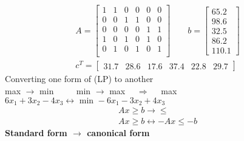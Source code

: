 \begin{gather*}
	A = \begin{bmatrix}
		1 & 1 & 0 & 0 & 0 & 0\\
		0 & 0 & 1 & 1 & 0 & 0\\
		0 & 0 & 0 & 0 & 1 & 1\\
		1 & 0 & 1 & 0 & 1 & 0\\
		0 & 1 & 0 & 1 & 0 & 1\\
	\end{bmatrix} \qquad b = 
	\begin{bmatrix}
		65.2\\
		98.6\\
		32.5\\
		86.2\\
		110.1
	\end{bmatrix}\\
	c^T = \begin{bmatrix}
		31.7 & 28.6 & 17.6 & 37.4 & 22.8 & 29.7
	\end{bmatrix}
\end{gather*}
Converting one form of (LP) to another\\
max $\rightarrow$ min $\qquad$ min $\rightarrow$ max $\quad \Longrightarrow \quad$ max $6x_1 + 3x_2 - 4x_3 \leftrightarrow \text{ min } -6x_1 - 3x_2 + 4x_3$
\begin{gather*}
	Ax \geq b \rightarrow \leq \\
	Ax \geq b \leftrightarrow \boxed{-A}x \leq \boxed{-b}
\end{gather*}
\textbf{Standard form $\rightarrow$ canonical form}
